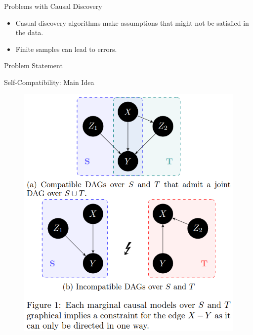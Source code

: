 \documentclass{beamer}
\begin{document}
\begin{frame}{Problems with Causal Discovery}
	\begin{itemize}
		\item Casual discovery algorithms make assumptions that might not be satisfied in the data.
		\item Finite samples can lead to errors.
	\end{itemize}
\end{frame}

\begin{frame}{Problem Statement}
\end{frame}

\begin{frame}{Self-Compatibility: Main Idea}
	\begin{figure}
		\centering
		\includegraphics[scale=0.3]{imgs/example.png}
	\end{figure}
\end{frame}
\end{document}
